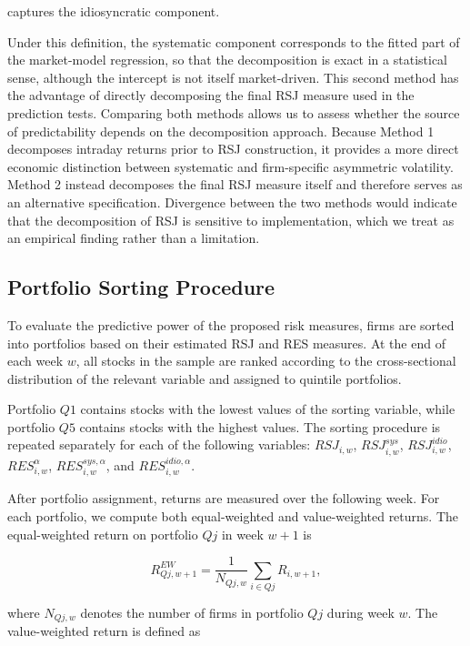 \documentclass[11pt,a4paper]{article}
\begin{document}
captures the idiosyncratic component.

Under this definition, the systematic component corresponds to the fitted
part of the market-model regression, so that the decomposition is exact
in a statistical sense, although the intercept is not itself market-driven.
This second method has the advantage of directly decomposing the final
RSJ measure used in the prediction tests. Comparing both methods allows
us to assess whether the source of predictability depends on the
decomposition approach. Because Method 1 decomposes intraday returns
prior to RSJ construction, it provides a more direct economic
distinction between systematic and firm-specific asymmetric volatility.
Method 2 instead decomposes the final RSJ measure itself and therefore
serves as an alternative specification. Divergence between the two
methods would indicate that the decomposition of RSJ is sensitive to
implementation, which we treat as an empirical finding rather than a
limitation.

\subsection{Portfolio Sorting Procedure}

To evaluate the predictive power of the proposed risk measures, firms are
sorted into portfolios based on their estimated RSJ and RES measures. At
the end of each week \(w\), all stocks in the sample are ranked according
to the cross-sectional distribution of the relevant variable and assigned
to quintile portfolios.

Portfolio \(Q1\) contains stocks with the lowest values of the sorting
variable, while portfolio \(Q5\) contains stocks with the highest values.
The sorting procedure is repeated separately for each of the following
variables: \(RSJ_{i,w}\), \(RSJ^{sys}_{i,w}\), \(RSJ^{idio}_{i,w}\),
\(RES^{\alpha}_{i,w}\), \(RES^{sys,\alpha}_{i,w}\), and
\(RES^{idio,\alpha}_{i,w}\).

After portfolio assignment, returns are measured over the following week.
For each portfolio, we compute both equal-weighted and value-weighted
returns. The equal-weighted return on portfolio \(Qj\) in week \(w+1\) is

\begin{equation}
R^{EW}_{Qj,w+1}
=
\frac{1}{N_{Qj,w}}
\sum_{i \in Qj} R_{i,w+1},
\label{eq:ew_return}
\end{equation}

where \(N_{Qj,w}\) denotes the number of firms in portfolio \(Qj\) during
week \(w\). The value-weighted return is defined as
\end{document}
